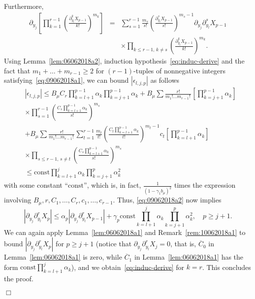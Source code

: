 \documentclass[aap,preprint]{imsart}
\newcommand{\proofendsign}{$\Box$}
\newenvironment{proof}{{\noindent \bf Proof }}
 {{\hspace*{\fill}\proofendsign\par\bigskip}}
\newcommand*{\const}{\mathrm{const}}
\newcommand*{\ol}{\overline}
\begin{document}
\begin{proof}
Furthermore,
\begin{eqnarray*}
\partial_{y_{j}}\left[\prod_{k=1}^{r-1}\left(\frac{\partial_{y_{l}}^{k}X_{p-1}}{k!}\right)^{m_{k}}\right]&=&\sum_{s=1}^{r-1}\frac{m_{s}}{s!}\left(\frac{\partial_{y_{l}}^{s}X_{p-1}}{s!}\right)^{m_{s}-1}\partial_{y_{j}}\partial_{y_{l}}^{s}X_{p-1}
\\
&& \times \prod_{k\le r-1,\,k\neq s}\left(\frac{\partial_{y_{l}}^{k}X_{p-1}}{k!}\right)^{m_{k}}.
\end{eqnarray*}
Using Lemma~\ref{lem:06062018a2},
induction hypothesis~\eqref{eq:induc-derive}
and the fact that $m_{1}+\ldots+m_{r-1}\ge2$
for $(r-1)$-tuples of nonnegative integers
satisfying~\eqref{eq:09062018a1},
we can bound $|\epsilon_{l,j,p}|$ as follows
\begin{align*}
&\left|\epsilon_{l,j,p}\right|  \leq  B_{\mu}C_{r}\prod_{k=l+1}^{p-1}\alpha_{k}\prod_{k=j+1}^{p-1}\alpha_{k}+B_{\mu}\sum\frac{r!}{m_{1}!\ldots m_{r-1}!\,}\left[\prod_{k=j+1}^{p-1}\alpha_{k}\right]
\\
&\times \prod_{s=1}^{r-1}\left(\frac{C_{s}\prod_{k=l+1}^{p-1}\alpha_{k}}{s!}\right)^{m_{s}}\\
&+B_{\mu}\sum\frac{r!}{m_{1}!\ldots m_{r-1}!\,}\sum_{t=1}^{r-1}\frac{m_t}{t!}\left(\frac{C_{t}\prod_{k=l+1}^{p-1}\alpha_{k}}{t!}\right)^{m_{t}-1}c_t\left[\prod_{k=l+1}^{p-1}\alpha_{k}\right]
\\
&\times \prod_{s\le r-1,\,s\neq t}\left(\frac{C_{s}\prod_{k=l+1}^{p-1}\alpha_{k}}{s!}\right)^{m_{s}}\\
& \leq \const\prod_{k=l+1}^{j}\alpha_{k}\prod_{k=j+1}^{p}\alpha_{k}^{2}
\end{align*}
with some constant ``$\const$'',
which is, in fact, $\frac1{(1-\gamma_1 b_\mu)^2}$ times
the expression involving
$B_\mu,r,C_1,\ldots,C_r,c_1,\ldots,c_{r-1}$.
Thus, \eqref{eq:09062018a2} now implies
$$
|\partial_{y_{j}}\partial_{y_{l}}^{r}X_{p}|
\le\alpha_p|\partial_{y_{j}}\partial_{y_{l}}^{r}X_{p-1}|
+\gamma_p \const\prod_{k=l+1}^{j}\alpha_{k}\prod_{k=j+1}^{p}\alpha_{k}^{2},
\quad p\ge j+1.
$$
We can again apply Lemma~\ref{lem:06062018a1}
and Remark~\ref{rem:10062018a1}
to bound $|\partial_{y_{j}}\partial_{y_{l}}^r X_{p}|$
for $p\ge j+1$
(notice that $\partial_{y_j}\partial_{y_l}^r X_j=0$, that is,
$\ol C_0$ in Lemma~\ref{lem:06062018a1} is zero,
while $\ol C_1$ in Lemma~\ref{lem:06062018a1}
has the form $\const\prod_{k=l+1}^j \alpha_k$),
and we obtain~\eqref{eq:induc-derive} for $k=r$.
This concludes the proof.
\end{proof}
\end{document}
